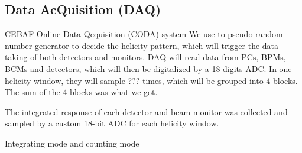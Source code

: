 \subsection{Data AcQuisition (DAQ)}
CEBAF Online Data Qcquisition (CODA) system
We use to pseudo random number generator to decide the helicity pattern, which
will trigger the data taking of both detectors and monitors. DAQ will read data
from PCs, BPMs, BCMs and detectors, which will then be digitalized by a 18 digits
ADC. In one helicity window, they will sample ??? times, which will be grouped
into 4 blocks. The sum of the 4 blocks was what we got.

The integrated response of each detector and beam monitor was collected and sampled 
by a custom 18-bit ADC for each helicity window.

Integrating mode and counting mode
